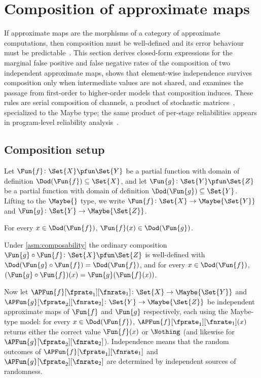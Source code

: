 \documentclass[ ../main.tex]{subfiles}
\begin{document}
\section{Composition of approximate maps}
\label{sec:composition}

If approximate maps are the morphisms of a category of approximate
computations, then composition must be well-defined and its error
behaviour must be predictable~\cite{cover2006}.  This section derives
closed-form expressions for the marginal false positive and false
negative rates of the composition of two independent approximate maps,
shows that element-wise independence survives composition only when
intermediate values are not shared, and examines the passage from
first-order to higher-order models that composition induces.
These rules are serial composition of channels, a product of stochastic
matrices~\cite{silverman1955,cover2006}, specialized to the Maybe type;
the same product of per-stage reliabilities appears in program-level
reliability analysis~\cite{carbin2013rely}.

\subsection{Composition setup}
\label{sec:comp-setup}

Let $\Fun{f} \colon \Set{X} \pfun \Set{Y}$ be a partial function with
domain of definition $\Dod(\Fun{f}) \subseteq \Set{X}$, and let
$\Fun{g} \colon \Set{Y} \pfun \Set{Z}$ be a partial function with
domain of definition $\Dod(\Fun{g}) \subseteq \Set{Y}$.
Lifting to the $\Maybe{}$ type, we write
$\Fun{f} \colon \Set{X} \to \Maybe{\Set{Y}}$ and
$\Fun{g} \colon \Set{Y} \to \Maybe{\Set{Z}}$.

\begin{assumption}[Composability]
\label{asm:composability}
For every $x \in \Dod(\Fun{f})$,
$\Fun{f}(x) \in \Dod(\Fun{g})$.
\end{assumption}

Under \cref{asm:composability} the ordinary composition
$\Fun{g} \circ \Fun{f} \colon \Set{X} \pfun \Set{Z}$ is well-defined
with $\Dod(\Fun{g} \circ \Fun{f}) = \Dod(\Fun{f})$, and for every
$x \in \Dod(\Fun{f})$,
$(\Fun{g} \circ \Fun{f})(x) = \Fun{g}(\Fun{f}(x))$.

Now let
$\APFun{f}[\fprate_1][\fnrate_1] \colon \Set{X} \to \Maybe{\Set{Y}}$
and
$\APFun{g}[\fprate_2][\fnrate_2] \colon \Set{Y} \to \Maybe{\Set{Z}}$
be independent approximate maps of $\Fun{f}$ and $\Fun{g}$
respectively, each using the Maybe-type model: for every
$x \in \Dod(\Fun{f})$, $\APFun{f}[\fprate_1][\fnrate_1](x)$ returns
either the correct value $\Fun{f}(x)$ or $\Nothing$ (and likewise for
$\APFun{g}[\fprate_2][\fnrate_2]$).
Independence means that the random outcomes of
$\APFun{f}[\fprate_1][\fnrate_1]$ and
$\APFun{g}[\fprate_2][\fnrate_2]$ are determined by independent
sources of randomness.
\end{document}

